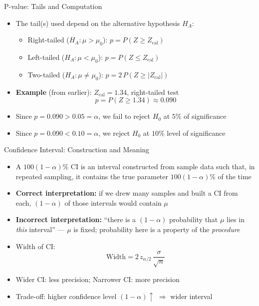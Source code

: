 \documentclass[12pt, aspectratio=169]{beamer}
\begin{document}
    \begin{frame}{P-value: Tails and Computation}
        \begin{itemize}
            \item The tail(s) used depend on the alternative hypothesis $H_A$:
            \begin{itemize}
                \item Right-tailed ($H_A: \mu > \mu_0$):
                \quad $p = P(Z \geqslant Z_{\text{cal}})$
                \item Left-tailed ($H_A: \mu < \mu_0$):
                \quad $p = P(Z \leqslant Z_{\text{cal}})$
                \item Two-tailed ($H_A: \mu \neq \mu_0$):
                \quad $p = 2\,P(Z \geqslant |Z_{\text{cal}}|)$
            \end{itemize}
            \item \textbf{Example} (from earlier): $Z_{\text{cal}} = 1.34$,\;
                right-tailed test
            \[
                p = P(Z \geqslant 1.34) \approx 0.090
            \]
            \item Since $p = 0.090 > 0.05 = \alpha$, we fail to reject $H_0$ at \(5\%\) of significance
            \item Since $p = 0.090 < 0.10 = \alpha$, we reject $H_0$ at \(10\%\) level of significance
        \end{itemize}
    \end{frame}


    \begin{frame}{Confidence Interval: Construction and Meaning}
        \begin{itemize}
            \item A $100(1-\alpha)\%$ CI is an interval constructed from sample data
                such that, in repeated sampling, it contains the true parameter
                $100(1-\alpha)\%$ of the time
            \item \textbf{Correct interpretation:} if we drew many samples and built a CI
                from each, $(1-\alpha)$ of those intervals would contain $\mu$
            \item \textbf{Incorrect interpretation:} ``there is a $(1-\alpha)$ probability
                that $\mu$ lies in \emph{this} interval'' ---
                $\mu$ is fixed; probability here is a property of the \emph{procedure}
            \item Width of CI:
            \[
                \text{Width} = 2\,z_{\alpha/2}\,\frac{\sigma}{\sqrt{n}}
            \]
            \item Wider CI: less precision; Narrower CI: more precision
            \item Trade-off: higher confidence level $(1-\alpha)\uparrow$
                $\Rightarrow$ wider interval
        \end{itemize}
    \end{frame}
\end{document}
